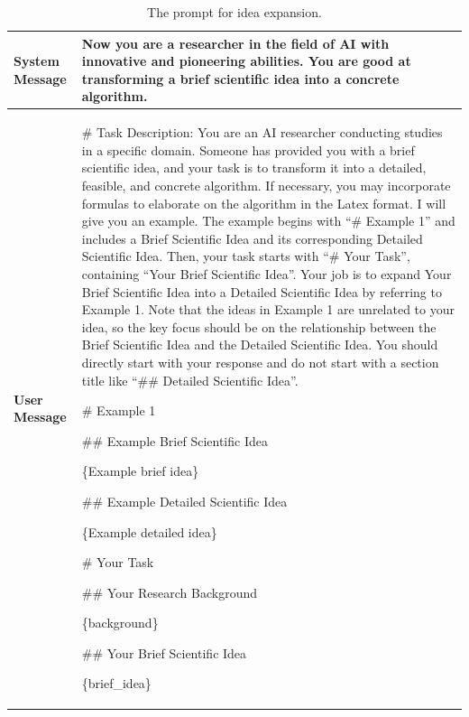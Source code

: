 \documentclass{article}
\theoremstyle{plain}
\theoremstyle{definition}
\theoremstyle{remark}
\begin{document}
\begin{table}[t]
	\centering  %
	\caption{The prompt for idea expansion.}  %
	\label{tab:ie}  %
	\begin{tabular}{l | m{}}  
		\toprule  %
            \textbf{System Message} & Now you are a researcher in the field of AI with innovative and pioneering abilities. You are good at transforming a brief scientific idea into a concrete algorithm. \\
            \midrule
            \textbf{User Message} & \# Task Description:
You are an AI researcher conducting studies in a specific domain. Someone has provided you with a brief scientific idea, and your task is to transform it into a detailed, feasible, and concrete algorithm. If necessary, you may incorporate formulas to elaborate on the algorithm in the Latex format. I will give you an example. The example begins with ``\# Example 1'' and includes a Brief Scientific Idea and its corresponding Detailed Scientific Idea. Then, your task starts with ``\# Your Task'', containing ``Your Brief Scientific Idea''. Your job is to expand Your Brief Scientific Idea into a Detailed Scientific Idea by referring to Example 1. Note that the ideas in Example 1 are unrelated to your idea, so the key focus should be on the relationship between the Brief Scientific Idea and the Detailed Scientific Idea. You should directly start with your response and do not start with a section title like ``\#\# Detailed Scientific Idea''. 

\# Example 1

\#\# Example Brief Scientific Idea

\{Example brief idea\}

\#\# Example Detailed Scientific Idea

\{Example detailed idea\}

\# Your Task

\#\# Your Research Background

\{background\}

\#\# Your Brief Scientific Idea

\{brief\_idea\} \\
		\bottomrule
	\end{tabular}
\end{table}
\end{document}
